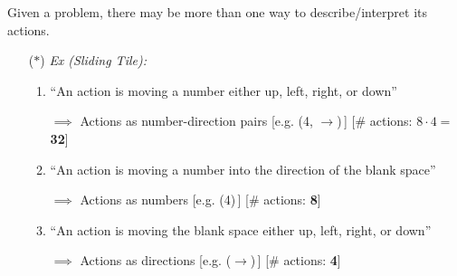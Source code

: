 \documentclass[12pt]{extarticle}
\theoremstyle{definition}
\theoremstyle{remark}
\newcommand{\pstart}[0]{\noindent}
\begin{document}
\vspace{8pt}
\pstart
Given a problem, there may be more than one way to describe/interpret its actions. \begin{itemize}
    \item[($\ast$)] \textit{Ex (Sliding Tile):} \begin{enumerate}
        \item ``An action is moving a number either up, left, right, or down'' 
        
        $\implies$ Actions as number-direction pairs [e.g. (4, $\rightarrow$)$\,$] \hspace*{\fill}[\# actions: $8\cdot 4=$ \textbf{32}]
        \item ``An action is moving a number into the direction of the blank space''

        $\implies$ Actions as numbers [e.g. (4)$\,$] \hspace*{\fill}[\# actions: \textbf{8}]

        \item ``An action is moving the blank space either up, left, right, or down''

        $\implies$ Actions as directions [e.g. ($\rightarrow$)$\,$] \hspace*{\fill}[\# actions: \textbf{4}]
    \end{enumerate}
\end{itemize}
\end{document}

